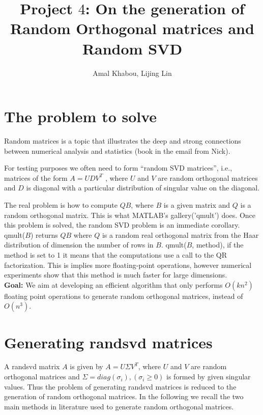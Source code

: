 \documentclass[a4paper]{article}
\title{Project $4$: On the generation of Random Orthogonal matrices and Random SVD}
\author{Amal Khabou, Lijing Lin }
\begin{document}
 

\maketitle

\section{The problem to solve} 

Random matrices is a topic that illustrates the deep and strong connections between numerical analysis and statistics 
\cite{} (book in the email from Nick).

For testing purposes we often need to form ``random SVD matrices'', i.e., matrices of the form $A = UDV^T$ , 
where $U$ and $V$ are random orthogonal matrices and $D$ is diagonal with a 
particular distribution of singular value on the diagonal.


The real problem is how to compute $QB$, where $B$ is a given matrix and $Q$ 
is a random orthogonal matrix. This is what MATLAB's gallery('qmult') does. 
Once this problem is solved, the random SVD problem is an immediate corollary.
qmult($B$) returns $QB$ where $Q$ is a random real orthogonal matrix from the 
Haar distribution of dimension the number of rows in $B$. 
qmult($B$, method), if the method is set to 1 it means that the computations 
use a call to the QR factorization. This is implies more floating-point operations, 
however numerical experiments show that this method is much faster for large dimensions.\\

\textbf{Goal:} We aim at developing an efficient algorithm that only performs 
$O(kn^2)$ floating point operations to generate random orthogonal matrices, instead of $O(n^3)$.


\section{Generating randsvd matrices}
A randsvd matrix $A$ is given by $A = U \Sigma V^T$, where $U$ and $V$ are random orthogonal matrices and 
$ \Sigma = diag(\sigma_i), (\sigma_i \geq 0)$ is formed by given singular values. Thus the problem of 
generating randsvd matrices is reduced to the generation of random orthogonal matrices. In the following 
we recall the two main methods in literature used to generate random orthogonal matrices.\\
\end{document}
